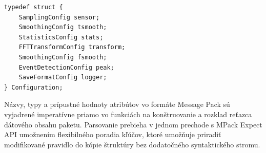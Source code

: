 \begin{lstlisting}[style=cstyle,label={config:struct},caption=Štruktúra systémovej konfigurácie,
morekeywords={Configuration}]
typedef struct {
    SamplingConfig sensor;
    SmoothingConfig tsmooth;
    StatisticsConfig stats;
    FFTTransformConfig transform;
    SmoothingConfig fsmooth;
    EventDetectionConfig peak;
    SaveFormatConfig logger;
} Configuration;
\end{lstlisting}

Názvy, typy a prípustné hodnoty atribútov vo formáte Message Pack sú vyjadrené imperatívne priamo vo funkciách
na konštruovanie a rozklad reťazca dátového obsahu paketu. Parsovanie prebieha v jednom prechode s MPack Expect API
umožnením flexibilného poradia kľúčov, ktoré umožňuje priradiť modifikované pravidlo do kópie štruktúry bez dodatočného
syntaktického stromu.
